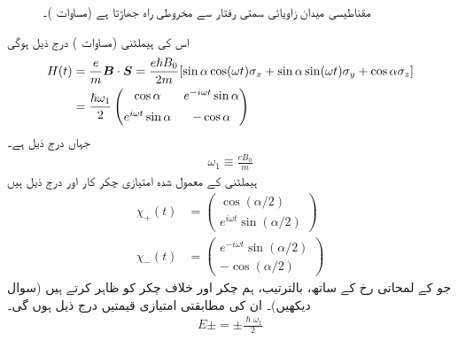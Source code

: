 \begin{figure}
\centering
{}
\caption{مقناطیسی میدان زاویائی سمتی رفتار  سے مخروطی راہ جھاڑتا ہے (مساوات )۔ }
\label{شکل_حرارت_نا_گزر_مخروطی_راہ_جھاڑنا}
\end{figure}


اس کی ہیملٹنی (مساوات ) درج ذیل ہوگی
\begin{gather}
\begin{aligned}\label{مساوات_حر_مخصوص_ہیملٹنی}
H(t) &= \frac{e}{m} {{\boldsymbol{B}}} \cdot {\ensuremath{{\boldsymbol{S}}}} = \frac{e \hslash B_0}{2m} [\sin \alpha \cos(\omega t) \sigma_x + \sin \alpha \sin(\omega t) \sigma_y + \cos \alpha \sigma_z] \\
&= \frac{\hslash \omega_1}{2}
\begin{pmatrix}
\cos \alpha& e^{-i\omega t}\sin \alpha\\[0.5em]
e^{i\omega t}\sin\alpha& -\cos\alpha
\end{pmatrix} 
\end{aligned}
\end{gather}
جہاں  درج ذیل ہے۔
\begin{align}
\omega_1 \equiv \frac{e B_0}{m}
\end{align}
ہیملٹنی  کے معمول شدہ امتیازی چکر کار  اور  درج ذیل ہیں
\begin{align}
\chi_+ (t) &= 
\begin{pmatrix}
\cos(\alpha/2) \\[0.5em]
e^{i \omega t} \sin(\alpha/2)
\end{pmatrix}\\
\chi_{-} (t) &= 
\begin{pmatrix}
e^{-i \omega t} \sin(\alpha/2) \\[0.5em]
- \cos(\alpha/2)
\end{pmatrix}
\end{align}
جو  کے لمحاتی رخ کے ساتھ، بالترتیب، ہم چکر اور خلاف چکر کو ظاہر کرتے ہیں (سوال  دیکھیں)۔ ان کی مطابقتی امتیازی قیمتیں درج ذیل ہوں گی۔
\begin{align}\label{مساوات_حر_حرکی_ہیّت_توانائی}
E \pm = \pm \frac{\hslash \omega_1}{2}
\end{align}

